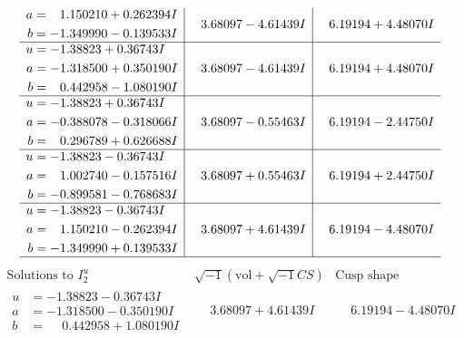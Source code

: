 \documentclass[1p]{elsarticle_modified}
\theoremstyle{definition}
\newcommand{\I}{\sqrt{-1}}
\begin{document}
$$\begin{array}{c|c|c}
\begin{aligned}
a &= \phantom{-}1.150210 + 0.262394 I \\
b &= -1.349990 - 0.139533 I\end{aligned}
 & \phantom{-}3.68097 - 4.61439 I & \phantom{-}6.19194 + 4.48070 I \\ \hline\begin{aligned}
u &= -1.38823 + 0.36743 I \\
a &= -1.318500 + 0.350190 I \\
b &= \phantom{-}0.442958 - 1.080190 I\end{aligned}
 & \phantom{-}3.68097 - 4.61439 I & \phantom{-}6.19194 + 4.48070 I \\ \hline\begin{aligned}
u &= -1.38823 + 0.36743 I \\
a &= -0.388078 - 0.318066 I \\
b &= \phantom{-}0.296789 + 0.626688 I\end{aligned}
 & \phantom{-}3.68097 - 0.55463 I & \phantom{-}6.19194 - 2.44750 I \\ \hline\begin{aligned}
u &= -1.38823 - 0.36743 I \\
a &= \phantom{-}1.002740 - 0.157516 I \\
b &= -0.899581 - 0.768683 I\end{aligned}
 & \phantom{-}3.68097 + 0.55463 I & \phantom{-}6.19194 + 2.44750 I \\ \hline\begin{aligned}
u &= -1.38823 - 0.36743 I \\
a &= \phantom{-}1.150210 - 0.262394 I \\
b &= -1.349990 + 0.139533 I\end{aligned}
 & \phantom{-}3.68097 + 4.61439 I & \phantom{-}6.19194 - 4.48070 I\\
 \hline 
 \end{array}$$\newpage$$\begin{array}{c|c|c}  
\text{Solutions to }I^u_{2}& \I (\text{vol} + \sqrt{-1}CS) & \text{Cusp shape}\\
 \hline 
\begin{aligned}
u &= -1.38823 - 0.36743 I \\
a &= -1.318500 - 0.350190 I \\
b &= \phantom{-}0.442958 + 1.080190 I\end{aligned}
 & \phantom{-}3.68097 + 4.61439 I & \phantom{-}6.19194 - 4.48070 I \\ \hline\begin{aligned}

\end{aligned}
\end{array}$$
\end{document}
